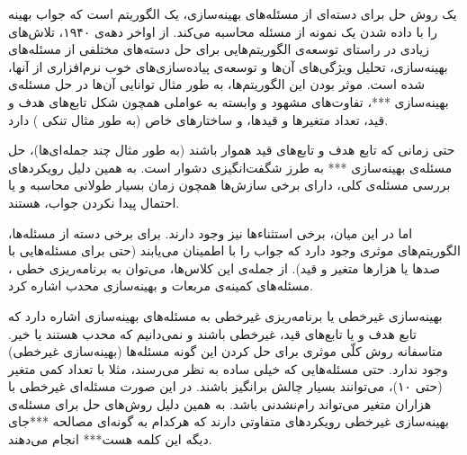 یک روش حل
برای دسته‌ای از مسئله‌های بهینه‌سازی، یک الگوریتم
 است که جواب بهینه را با داده شدن یک نمونه از مسئله‌
محاسبه می‌کند. از اواخر دهه‌ی ۱۹۴۰، تلاش‌های زیادی در راستای توسعه‌ی الگوریتم‌هایی برای حل دسته‌های مختلفی از مسئله‌های بهینه‌سازی، تحلیل ویژگی‌های آن‌ها و توسعه‌ی پیاده‌سازی‌های خوب نرم‌افزاری از آنها، شده است. موثر بودن این الگوریتم‌ها، به طور مثال توانایی آن‌ها در حل مسئله‌ی بهینه‌سازی ***، تفاوت‌های مشهود و وابسته به عواملی همچون شکل تابع‌های هدف و قید، تعداد متغیرها و قیدها، و ساختارهای خاص (به طور مثال تنکی
) 
دارد.


حتی زمانی که تابع هدف و تابع‌های قید هموار
باشند (به طور مثال چند جمله‌ای‌ها)، حل مسئله‌ی بهینه‌سازی *** به طرز شگفت‌انگیزی دشوار است. به همین دلیل رویکردهای بررسی مسئله‌ی کلی، دارای برخی سازش‌ها
همچون زمان بسیار طولانی محاسبه و یا احتمال پیدا نکردن جواب، هستند.


اما در این میان، برخی استثناء‌ها نیز وجود دارند. برای برخی دسته از مسئله‌ها، الگوریتم‌های موثری وجود دارد که جواب را با اطمینان می‌یابند (حتی برای مسئله‌هایی با صدها یا هزارها متغیر و قید). از جمله‌ی این کلاس‌ها، می‌توان به برنامه‌ریزی خطی
، 
مسئله‌های کمینه‌ی مربعات
و بهینه‌سازی محدب اشاره کرد.





بهینه‌سازی غیرخطی
یا برنامه‌ریزی غیرخطی
به مسئله‌های بهینه‌سازی اشاره دارد که تابع هدف و یا تابع‌های قید، غیرخطی باشند و نمی‌دانیم که محدب هستند یا خیر. متاسفانه روش کلّی موثری برای حل کردن این گونه مسئله‌ها (بهینه‌سازی غیرخطی) وجود ندارد. حتی مسئله‌هایی که خیلی ساده به نظر می‌رسند، مثلا با تعداد کمی متغیر (حتی ۱۰)، می‌توانند بسیار چالش برانگیز باشند. در این صورت مسئله‌ای غیرخطی با هزاران متغیر می‌تواند رام‌نشدنی
باشد. به همین دلیل روش‌های حل برای مسئله‌ی بهینه‌سازی غیرخطی رویکردهای متفاوتی دارند که هرکدام به گونه‌ای مصالحه
***جای دیگه این کلمه هست***
انجام می‌دهند.

